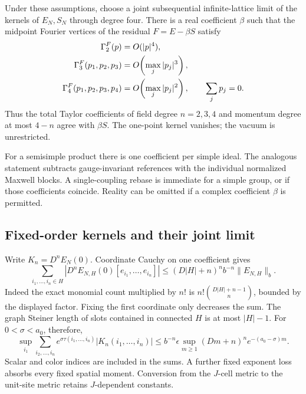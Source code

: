 \begin{theorem}
\label{tkw-theorem}
Under these assumptions, choose a joint subsequential infinite-lattice
limit of the kernels of \(E_N,S_N\) through degree four. There is a real
coefficient \(\beta\) such that the midpoint Fourier vertices of the
residual \(F=E-\beta S\) satisfy
\begin{align}
 \Gamma_2^F(p)&=O(|p|^4),\notag\\
 \Gamma_3^F(p_1,p_2,p_3)
     &=O\!\left(\max_j|p_j|^3\right),\notag\\
 \Gamma_4^F(p_1,p_2,p_3,p_4)
     &=O\!\left(\max_j|p_j|^2\right),
 \qquad \sum_jp_j=0.
 \label{tkw-remainders}
\end{align}
Thus the total Taylor coefficients of field degree \(n=2,3,4\)
and momentum degree at most \(4-n\) agree with \(\beta S\).
The one-point kernel vanishes; the vacuum is unrestricted.
\end{theorem}

For a semisimple product there is one coefficient per simple ideal.
The analogous statement subtracts gauge-invariant references with the
individual normalized Maxwell blocks. A single-coupling rebase is
immediate for a simple group, or if those coefficients coincide.
Reality can be omitted if a complex coefficient \(\beta\) is permitted.

\subsection{Fixed-order kernels and their joint limit}
\label{tkw-kernel-limit}

Write \(K_n=D^nE_N(0)\). Coordinate Cauchy on one coefficient gives
\begin{equation}
 \sum_{i_1,\ldots,i_n\in H}
  |D^nE_{N,H}(0)[e_{i_1},\ldots,e_{i_n}]|
 \le (D|H|+n)^n b^{-n}\|E_{N,H}\|_b .
 \label{tkw-coordinate-Cauchy}
\end{equation}
Indeed the exact monomial count multiplied by \(n!\) is
\(n!\binom{D|H|+n-1}{n}\), bounded by the displayed factor.
Fixing the first coordinate only decreases the sum. The graph
Steiner length of slots contained in connected \(H\) is at most
\(|H|-1\). For \(0<\sigma<a_0\), therefore,
\begin{equation}
 \sup_{i_1}\sum_{i_2,\ldots,i_n}
 e^{\sigma\tau(i_1,\ldots,i_n)}
 |K_n(i_1,\ldots,i_n)|
 \le b^{-n}\epsilon
       \sup_{m\ge1}(Dm+n)^n e^{-(a_0-\sigma)m}.
 \label{tkw-kernel-bound}
\end{equation}
Scalar and color indices are included in the sums. A further fixed
exponent loss absorbs every fixed spatial moment. Conversion from
the \(J\)-cell metric to the unit-site metric retains \(J\)-dependent
constants.

